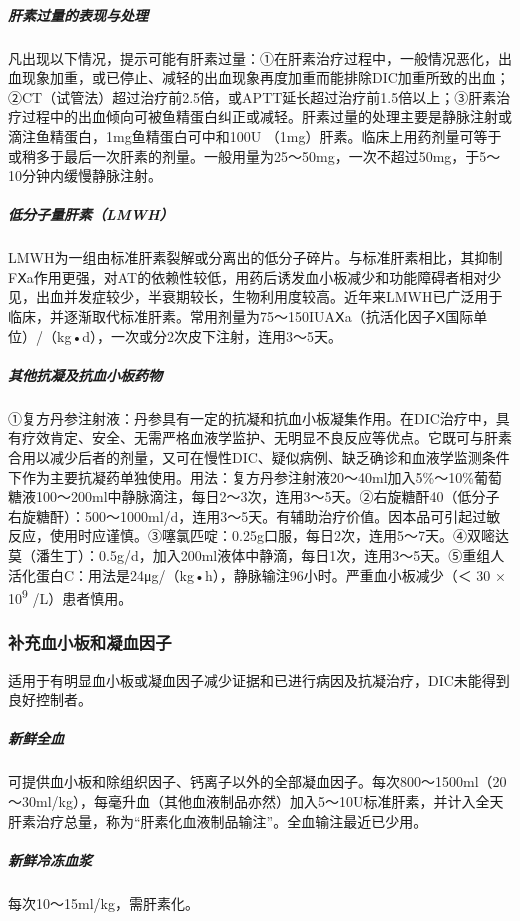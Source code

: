 \subparagraph{肝素过量的表现与处理}

凡出现以下情况，提示可能有肝素过量：①在肝素治疗过程中，一般情况恶化，出血现象加重，或已停止、减轻的出血现象再度加重而能排除DIC加重所致的出血；②CT（试管法）超过治疗前2.5倍，或APTT延长超过治疗前1.5倍以上；③肝素治疗过程中的出血倾向可被鱼精蛋白纠正或减轻。肝素过量的处理主要是静脉注射或滴注鱼精蛋白，1mg鱼精蛋白可中和100U
（1mg）肝素。临床上用药剂量可等于或稍多于最后一次肝素的剂量。一般用量为25～50mg，一次不超过50mg，于5～10分钟内缓慢静脉注射。

\subparagraph{低分子量肝素（LMWH）}

LMWH为一组由标准肝素裂解或分离出的低分子碎片。与标准肝素相比，其抑制FⅩa作用更强，对AT的依赖性较低，用药后诱发血小板减少和功能障碍者相对少见，出血并发症较少，半衰期较长，生物利用度较高。近年来LMWH已广泛用于临床，并逐渐取代标准肝素。常用剂量为75～150IUAⅩa（抗活化因子Ⅹ国际单位）/（kg•d），一次或分2次皮下注射，连用3～5天。

\subparagraph{其他抗凝及抗血小板药物}

①复方丹参注射液：丹参具有一定的抗凝和抗血小板凝集作用。在DIC治疗中，具有疗效肯定、安全、无需严格血液学监护、无明显不良反应等优点。它既可与肝素合用以减少后者的剂量，又可在慢性DIC、疑似病例、缺乏确诊和血液学监测条件下作为主要抗凝药单独使用。用法：复方丹参注射液20～40ml加入5\%～10\%葡萄糖液100～200ml中静脉滴注，每日2～3次，连用3～5天。②右旋糖酐40（低分子右旋糖酐）：500～1000ml/d，连用3～5天。有辅助治疗价值。因本品可引起过敏反应，使用时应谨慎。③噻氯匹啶：0.25g口服，每日2次，连用5～7天。④双嘧达莫（潘生丁）：0.5g/d，加入200ml液体中静滴，每日1次，连用3～5天。⑤重组人活化蛋白C：用法是24μg/（kg•h），静脉输注96小时。严重血小板减少（＜
30 × 10\textsuperscript{9} /L）患者慎用。

\subsubsection{补充血小板和凝血因子}

适用于有明显血小板或凝血因子减少证据和已进行病因及抗凝治疗，DIC未能得到良好控制者。

\subparagraph{新鲜全血}

可提供血小板和除组织因子、钙离子以外的全部凝血因子。每次800～1500ml（20～30ml/kg），每毫升血（其他血液制品亦然）加入5～10U标准肝素，并计入全天肝素治疗总量，称为“肝素化血液制品输注”。全血输注最近已少用。

\subparagraph{新鲜冷冻血浆}

每次10～15ml/kg，需肝素化。


